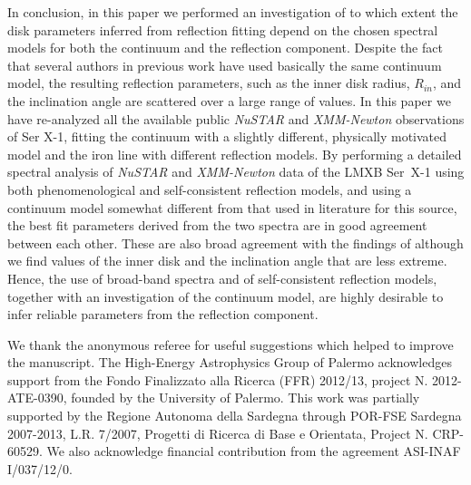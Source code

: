 \documentclass{aa}
\begin{document}
In conclusion, in this paper we performed an investigation of to which extent the 
disk parameters inferred from reflection fitting depend on the chosen spectral models
for both the continuum and the reflection component. Despite the fact that several 
authors in previous work have used basically the same continuum model, the resulting  
reflection parameters, such as the inner disk radius, $R_{in}$, and the inclination angle
are scattered over a large range of values. In this paper we have re-analyzed all the 
available public \emph{NuSTAR} and \emph{XMM-Newton} observations of Ser X-1, fitting 
the continuum with a slightly different, physically motivated model and the iron line 
with different reflection models. By performing a detailed spectral 
analysis of \emph{NuSTAR} and \emph{XMM-Newton} data of the LMXB Ser~X-1 using both 
phenomenological and self-consistent reflection models, and using a continuum model 
somewhat different from that used in literature for this source, the best fit parameters 
derived from the two spectra are in good agreement between each other. These are also
broad agreement with the findings of \citet{Miller.etal:13} although we find values of 
the inner disk and the inclination angle that are less extreme. Hence, the use of 
broad-band spectra and of self-consistent reflection models, together with an investigation
of the continuum model, are highly desirable to infer reliable parameters from the 
reflection component.


\begin{acknowledgements}
We thank the anonymous referee for useful suggestions which helped to improve the
manuscript.
The High-Energy Astrophysics Group of Palermo acknowledges support from 
the Fondo Finalizzato alla Ricerca (FFR) 2012/13, project N. 2012-ATE-0390, 
founded by the University of Palermo. This work was partially supported by 
the Regione Autonoma della Sardegna through POR-FSE Sardegna 2007-2013, 
L.R. 7/2007, Progetti di Ricerca di Base e Orientata, Project N. CRP-60529. 
We also acknowledge financial contribution from the agreement ASI-INAF I/037/12/0. 
\end{acknowledgements}
\end{document}
